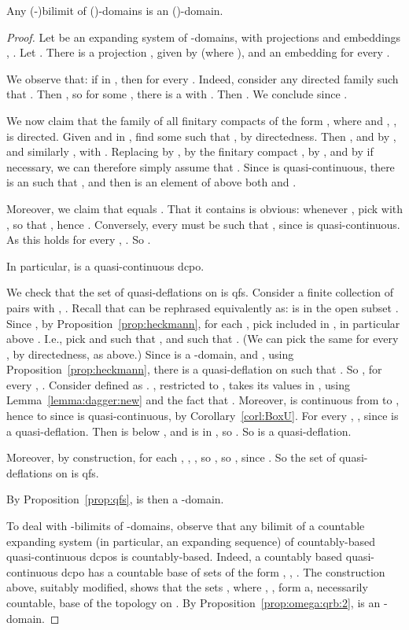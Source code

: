 \documentclass{LMCS}
\begin{document}
\begin{thm}
  \label{thm:qrb:bilimit}
  Any (-)bilimit of ()-domains is an
  ()-domain.
\end{thm}
\begin{proof}
  Let  be an expanding system of -domains,
  with projections  and embeddings , .  Let .  There is a
  projection , given by  (where
  ), and an embedding 
  for every .

  We observe that:  if  in , then
   for every .
  Indeed, consider any directed family  such that
  .  Then , so for some , there is a  with .  Then .  We conclude since .

  We now claim that the family  of all finitary
  compacts of the form , where  and , , is directed.
  Given  and  in , find some  such that , by
  directedness.  Then , and by  ,
  and similarly , with .
  Replacing  by ,  by the finitary compact ,  by , and  by  if necessary, we can therefore simply assume that .  Since
   is quasi-continuous, there is an  such
  that , and then
   is an element of  above both
   and .

  Moreover, we claim that  equals .  That it
  contains  is obvious: whenever ,
  pick  with , so that , hence .
  Conversely, every  must be such that , since  is
  quasi-continuous.  As this holds for every , .  So .

  In particular,  is a quasi-continuous dcpo.


  We check that the set of quasi-deflations on  is qfs.  Consider a
  finite collection of pairs  with , .
  Recall that  can be rephrased
  equivalently as:  is in the open subset .
Since , by
  Proposition~\ref{prop:heckmann}, for each , pick  included in , in particular above .  I.e., pick  and
   such that ,
  and such that .
(We can pick the same  for every , by directedness, as above.)
  Since  is a -domain, and ,
  using Proposition~\ref{prop:heckmann}, there is a quasi-deflation
   on  such that .  So ,
  for every , .  Consider 
  defined as .  ,
  restricted to , takes its values in , using
  Lemma~\ref{lemma:dagger:new} and the fact that .  Moreover,  is continuous from
   to , hence to  since  is
  quasi-continuous, by Corollary~\ref{corl:BoxU}.  For every , , since 
  is a quasi-deflation.  Then  is below ,
  and is in , so .  So 
  is a quasi-deflation.

  Moreover, by construction, for each , , , so , so , since .  So the set
  of quasi-deflations on  is qfs.

  By Proposition~\ref{prop:qfs},  is then a -domain.

  To deal with -bilimits of -domains, observe that
  any bilimit of a countable expanding system (in particular, an
  expanding sequence) of countably-based quasi-continuous dcpos is
  countably-based.  Indeed, a countably based quasi-continuous dcpo
   has a countable base of sets of the form ,
  , .  The  construction above, suitably modified, shows that the sets
  , where , , form a, necessarily countable, base of
  the topology on .  By Proposition~\ref{prop:omega:qrb:2},  is
  an -domain.
\end{proof}
\end{document}

